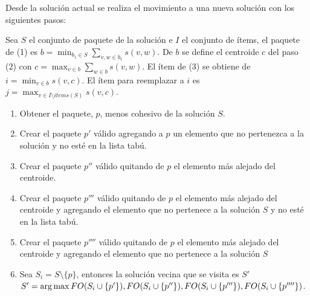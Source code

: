 Desde la solución actual se realiza el movimiento a una nueva solución con los siguientes pasos:

Sea $S$ el conjunto de paquete de la solución e $I$ el conjunto de ítems, el paquete de (1) es $b = \min_{b_1 \in S}{\sum_{v,w \in b_1}{s(v,w)}}$. De $b$ se define el centroide $c$ del paso (2) con $c = \max_{v \in b}{\sum_{w \in b}{s(v,w)}}$. El ítem de (3) se obtiene de $i = \min_{v \in b}{s(v,c)}$. El ítem para reemplazar a $i$ es $j = \max_{v \in I \setminus items(S)}{s(v,c)}$.

\begin{enumerate}
	\item Obtener el paquete, $p$, menos cohesivo de la solución $S$.
	\item Crear el paquete $p'$ válido agregando a $p$ un elemento que no pertenezca a la solución y no esté en la lista tabú.
	\item Crear el paquete $p''$ válido quitando de $p$ el elemento más alejado del centroide.
	\item Crear el paquete $p'''$ válido quitando de $p$ el elemento más alejado del centroide y agregando el elemento que no pertenece a la solución $S$ y no esté en la lista tabú.
	\item Crear el paquete $p''''$ válido quitando de $p$ el elemento más alejado del centroide y agregando el elemento que no pertenece a la solución $S$
	\item Sea $S_{i} = S\setminus \{p\}$, entonces la solución vecina que se visita es $S'$\\
	$S' = \operatorname*{arg\,max} {FO(S_{i}\cup\{p'\}), FO(S_{i}\cup\{p''\}), FO(S_{i}\cup\{p'''\}), FO(S_{i}\cup\{p''''\})}$.
\end{enumerate}

